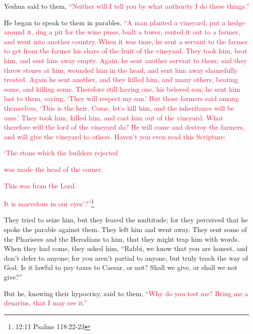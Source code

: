 Yeshua said to them,
\textcolor{crimson}{“Neither will I tell you by what authority I do these things.”}


\mychapter{} \myverse*{}He began to speak to them in parables.
\textcolor{crimson}{“A man planted a vineyard, put a hedge around it, dug a pit for the wine press, built a tower, rented
	it out to a farmer, and went into another country.
}
\myverse{}\textcolor{crimson}{When it was time, he sent a servant to the farmer to get from the farmer
	his share of the fruit of the vineyard.
}
\myverse{}\textcolor{crimson}{They took him, beat him, and sent him away empty.
}
\myverse{}\textcolor{crimson}{Again, he sent another servant to them; and they threw stones at him, wounded
	him in the head, and sent him away shamefully treated.
}
\myverse{}\textcolor{crimson}{Again he sent another, and they killed him, and many others, beating some,
	and killing some.
}
\myverse{}\textcolor{crimson}{Therefore still having one, his beloved son, he sent him last to them,
	saying, ‘They will respect my son.’
}
\myverse{}\textcolor{crimson}{But those farmers said among themselves, ‘This is the heir. Come, let’s
	kill him, and the inheritance will be ours.’
}
\myverse{}\textcolor{crimson}{They took him, killed him, and cast him out of the vineyard.
}
\myverse{}\textcolor{crimson}{What therefore will the lord of the vineyard do? He will come and destroy
	the farmers, and will give the vineyard to others.
}
\myverse{}\textcolor{crimson}{Haven’t you even read this Scripture:}

\textcolor{crimson}{‘The stone which the builders rejected}

\textcolor{crimson}{was made the head of the corner.}

\myverse{}\textcolor{crimson}{This was from the Lord.}

\textcolor{crimson}{It is marvelous in our eyes’?”}\footnote{12:11 Psalms 118:22-23}

\myverse{}They tried to seize him, but they feared the multitude; for
they perceived that he spoke the parable against them. They left him and went away.
\myverse{}They sent some of the Pharisees and the Herodians to him, that they might
trap him with words.
\myverse{}When they had come, they asked him, “Rabbi, we know that you are honest,
and don’t defer to anyone; for you aren’t partial to anyone, but truly teach the way of God. Is it lawful
to pay taxes to Caesar, or not?
\myverse{}Shall we give, or shall we not give?”

But he, knowing their hypocrisy, said to them,
\textcolor{crimson}{“Why do you test me? Bring me a denarius, that I may see it.”}

